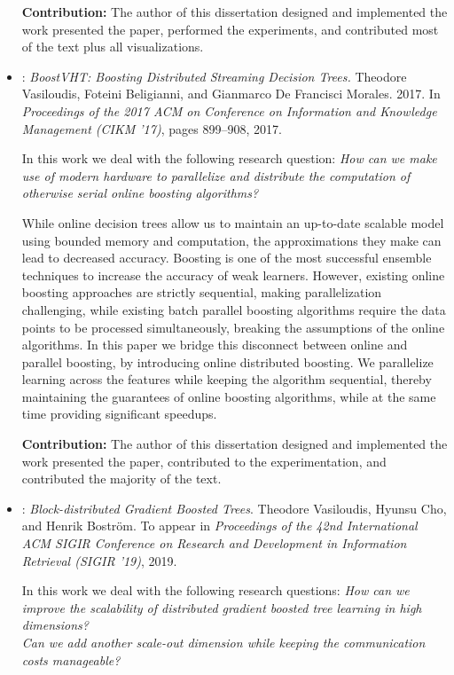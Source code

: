 \begin{itemize}
	\textbf{Contribution:} The author of this dissertation designed and implemented the
	work presented the paper, performed the experiments, and contributed most of the text plus all visualizations.

	\item \textbf{\boostvht}: \emph{BoostVHT: Boosting Distributed Streaming Decision Trees.} Theodore Vasiloudis, Foteini Beligianni, and Gianmarco De Francisci Morales. 2017.  In \emph{Proceedings of the 2017 ACM on Conference on Information and Knowledge Management (CIKM '17)}, pages 899--908, 2017.

	In this work we deal with the following research question:
	\emph{How can we make use of modern hardware to parallelize and distribute
	the computation of otherwise serial online boosting algorithms?}

	While online decision trees allow us to maintain an up-to-date scalable
	model using bounded memory and computation, the approximations they make
	can lead to decreased accuracy.
	Boosting is one of the most successful ensemble techniques to increase the
	accuracy of weak learners. However, existing online boosting approaches
	are strictly sequential, making parallelization challenging, while existing batch parallel boosting algorithms
	require the data points to be processed simultaneously, breaking the assumptions
	of the online algorithms. In this paper we bridge
	this disconnect between online and parallel boosting, by introducing
	online distributed boosting. We parallelize learning
	across the features while keeping the algorithm sequential, thereby maintaining the guarantees of online boosting
	algorithms, while at the same time providing significant speedups.

	\textbf{Contribution:} The author of this dissertation designed and implemented the
	work presented the paper, contributed to the experimentation, and contributed the majority of the text.


	\item \textbf{\blockgbt}: \emph{Block-distributed Gradient Boosted Trees}. Theodore Vasiloudis, Hyunsu Cho, and Henrik Bostr\"{o}m. To appear in \emph{Proceedings of the 42nd
	International ACM SIGIR Conference on Research and Development in Information
	Retrieval (SIGIR '19)}, 2019.


	In this work we deal with the following research questions:
	\emph{How can we improve the scalability of distributed gradient boosted tree learning
	in high dimensions?\\
	Can we add another scale-out dimension while keeping the
	communication costs manageable?}


\end{itemize}
